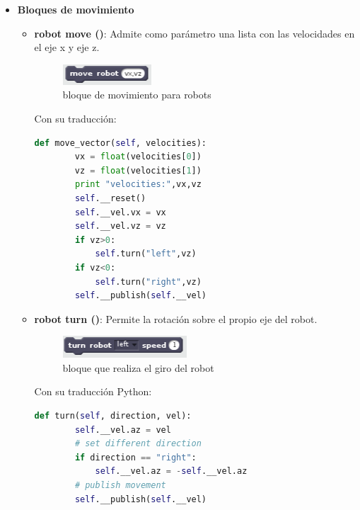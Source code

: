 \begin{itemize}
\begin{itemize}
	\end{itemize}
\item \textbf{Bloques de movimiento}
	\begin{itemize}

	\item \textbf{robot move ()}: Admite como parámetro una lista con las velocidades en el eje x y eje z.
		\begin{figure}[H]
     		\centering
     		\includegraphics[scale=1.2]{img/block-move-robot.png}
     		\caption{bloque de movimiento para robots}
  		\label{fig:listas}
  	\end{figure}
  	
Con su traducción:\\

\begin{lstlisting}[language=python,firstnumber=1]
    def move_vector(self, velocities):
        vx = float(velocities[0])
        vz = float(velocities[1])
        print "velocities:",vx,vz
        self.__reset()
        self.__vel.vx = vx
        self.__vel.vz = vz
        if vz>0:
            self.turn("left",vz)
        if vz<0:
            self.turn("right",vz)
        self.__publish(self.__vel)
\end{lstlisting}

	\item \textbf{robot turn ()}: Permite la rotación sobre el propio eje del robot.
	\begin{figure}[H]
     		\centering
     		\includegraphics[scale=1.2]{img/block-turn.png}
     		\caption{bloque que realiza el giro del robot}
  		\label{fig:listas}
  	\end{figure}
  	
Con su traducción Python:\\

\begin{lstlisting}[language=python,firstnumber=1]
    def turn(self, direction, vel):
        self.__vel.az = vel
        # set different direction
        if direction == "right":
            self.__vel.az = -self.__vel.az
        # publish movement
        self.__publish(self.__vel)
\end{lstlisting}
	\end{itemize}
\end{itemize}


